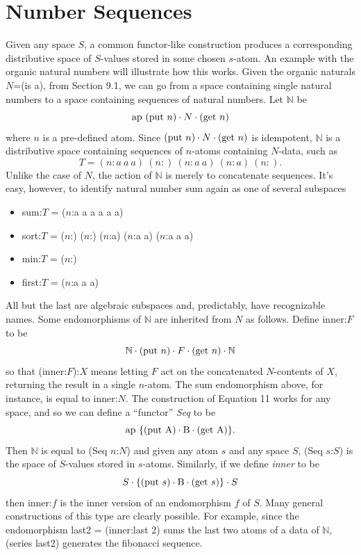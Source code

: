 \documentclass[11pt]{article}
\begin{document}
\section{Number Sequences}

      Given any space $S$, a common functor-like construction produces a corresponding distributive space of 
$S$-values stored in some chosen $s$-atom.  An example with the organic natural numbers will illustrate how this works. 
Given the organic naturals $N$=(is a), from Section 9.1, we can go from a space containing single natural numbers to a space 
containing sequences of natural numbers.  
Let $\mathbb{N}$ be 
\begin{equation}
{{\rm ap}\ ({\rm put}\ n)\cdot N \cdot ({\rm get}\ n)}
\end{equation}
where $n$ is a pre-defined atom.  Since $({\rm put}\ n)\cdot N \cdot ({\rm get}\ n)$ is idempotent, ${\mathbb N}$ is a distributive space containing 
sequences of $n$-atoms containing $N$-data, such as 
\begin{equation} 
T = (n:a\ a\ a)\ (n:)\ (n:a\ a)\ (n:a)\ (n:).
\end{equation} 
Unlike the case of $N$, the action of ${\mathbb N}$ is merely to concatenate sequences.  It's easy, however, to identify 
natural number sum again as one of several subspaces 
\begin{itemize}
\item sum:$T$ = ($n$:a a a a a a)
\item sort:$T$ = ($n$:) ($n$:) ($n$:a) ($n$:a a) ($n$:a a a)
\item min:$T$ = ($n$:)
\item first:$T$ = ($n$:a a a)
\end{itemize} 
All but the last are algebraic subspaces and, predictably, have recognizable names.  
Some endomorphisms of ${\mathbb N}$ are inherited from $N$ as follows.  Define inner:$F$ to be 
\begin{equation}
{\mathbb N}\cdot({\rm put}\ n)\cdot F\cdot({\rm get}\ n)\cdot{\mathbb N}
\end{equation}
so that (inner:$F$):$X$ means letting $F$ act on the concatenated $N$-contents of $X$, returning the result in a single $n$-atom.  The sum endomorphism 
above, for instance, is equal to inner:$N$.  The construction of Equation 11 works for any space, and so we can define a ``functor'' {\it Seq} to be 
\begin{equation}
{\rm ap}\ \{({\rm put}\ {\rm A})\cdot {\rm B} \cdot ({\rm get}\ {\rm A})\}.
\end{equation}
Then {$\mathbb N$} is equal to (Seq $n$:$N$) and given any atom $s$ and any space $S$, (Seq $s$:$S$) is the space of $S$-values stored in $s$-atoms.  
Similarly, if we define {\it inner} to be  
\begin{equation}
S\cdot\{({\rm put}\ s)\cdot{\rm B}\cdot({\rm get}\ s)\}\cdot S
\end{equation}
then inner:$f$ is the inner version of an endomorphism $f$ of $S$.  Many general constructions of this type are clearly possible.  For example, 
since the endomorphism last2 = (inner:last 2) sums the last two atoms of a data of ${\mathbb N}$, (series last2) generates the fibonacci sequence. 
\end{document}

